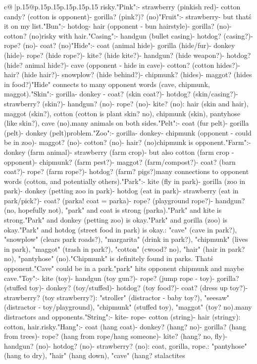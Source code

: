 \documentclass{article}
\begin{document}
{\begin{supertabular}{c@{$\;$}|p{.15\linewidth}@{}p{.15\linewidth}p{.15\linewidth}p{.15\linewidth}p{.15\linewidth}p{.15\linewidth}}
{{{risky.\n\n"Pink":\n- strawberry (pinkish red)\n- cotton candy? (cotton is opponent)\n- gorilla? (pink?)\nDonkey? (no)\n\n"Fruit":\n- strawberry\n- but that\'s it on my list.\n\n"Bun":\n- hotdog\n- hair (opponent - bun hairstyle)\n- gorilla? (no)\n- cotton? (no)\nToo risky with hair.\n\n"Casing":\n- handgun (bullet casing)\n- hotdog? (casing?)\n- rope? (no)\n- coat? (no)\n\n"Hide":\n- coat (animal hide)\n- gorilla (hide/fur)\n- donkey (hide)\n- rope? (hide rope?)\n- kite? (hide kite?)\n- handgun? (hide weapon?)\n- hotdog? (hide? animal hide?)\n- cave (opponent - hide in cave)\n- cotton? (cotton hides?)\n- hair? (hide hair?)\n- snowplow? (hide behind?)\n- chipmunk? (hides)\n- maggot? (hides in food?)\n"Hide" connects to many opponent words (cave, chipmunk, maggot).\n\n"Skin":\n- gorilla\n- donkey  \n- coat? (skin coat?)\n- hotdog? (skin/casing?)\n- strawberry? (skin?)\n- handgun? (no)\n- rope? (no)\n- kite? (no)\nOpponent: hair (skin and hair), maggot (skin?), cotton (cotton is plant skin? no), chipmunk (skin), pantyhose (like skin?), cave (no).\nToo many animals on both sides.\n\n"Pelt":\n- coat (fur pelt)\n- gorilla (pelt)\n- donkey (pelt)\nSame problem.\n\n"Zoo":\n- gorilla\n- donkey\n- chipmunk (opponent - could be in zoo)\n- maggot? (no)\n- cotton? (no)\n- hair? (no)\nBut chipmunk is opponent.\n\n"Farm":\n- donkey (farm animal)\n- strawberry (farm crop)\n- but also cotton (farm crop - opponent)\n- chipmunk? (farm pest?)\n- maggot? (farm/compost?)\n- coat? (barn coat?)\n- rope? (farm rope?)\n- hotdog? (farm? pigs?)\nToo many connections to opponent words (cotton, and potentially others).\n\n"Park":\n- kite (fly in park)\n- gorilla (zoo in park)\n- donkey (petting zoo in park)\n- hotdog (eat in park)\n- strawberry (eat in park/pick?)\n- coat? (parka! coat = parka)\n- rope? (playground rope?)\n- handgun? (no, hopefully not)\nWait, "park" and coat is strong (parka).\n"Park" and kite is strong.\n"Park" and donkey (petting zoo) is okay.\n"Park" and gorilla (zoo) is okay.\n"Park" and hotdog (street food in park) is okay.\nOpponent: "cave" (cave in park?), "snowplow" (clears park roads?), "margarita" (drink in park?), "chipmunk" (lives in park), "maggot" (trash in park?), "cotton" (cwood? no), "hair" (hair in park? no), "pantyhose" (no).\n"Chipmunk" is definitely found in parks. That\'s opponent.\n"Cave" could be in a park.\nSo "park" hits opponent chipmunk and maybe cave.\n\n"Toy":\n- kite (toy)\n- handgun (toy gun?)\n- rope? (jump rope - toy)\n- gorilla? (stuffed toy)\n- donkey? (toy/stuffed)\n- hotdog? (toy food?)\n- coat? (dress up toy?)\n- strawberry? (toy strawberry?)\nOpponent: "stroller" (distractor - baby toy?), "seesaw" (distractor - toy/playground), "chipmunk" (stuffed toy), "maggot" (toy? no).\nToo many distractors and opponents.\n\n"String":\n- kite\n- rope\n- cotton (string)\n- hair (stringy)\nOpponent: cotton, hair.\nToo risky.\n\n"Hang":\n- coat (hang coat)\n- donkey? (hang? no)\n- gorilla? (hang from trees)\n- rope? (hang from rope/hang someone)\n- kite? (hang? no, fly)\n- handgun? (no)\n- hotdog? (no)\n- strawberry? (no)\nSo: coat, gorilla, rope.\nOpponent: "pantyhose" (hang to dry), "hair" (hang down), "cave" (hang? stalactites }}}
\end{supertabular}}
\end{document}
